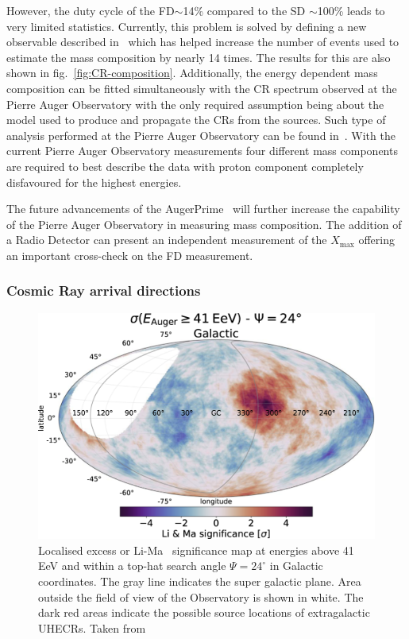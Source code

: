 However, the duty cycle of the \gls{FD}$\sim$14\% compared to the \gls{SD} $\sim$100\% leads to very limited statistics. Currently, this problem is solved by defining a new observable described in~\cite{2017arXiv171007249T} which has helped increase the number of events used to estimate the mass composition by nearly 14 times. The results for this are also shown in fig.~\ref{fig:CR-composition}. Additionally, the energy dependent mass composition can be fitted simultaneously with the \gls{CR} spectrum observed at the Pierre Auger Observatory with the only required assumption being about the model used to produce and propagate the \glspl{CR} from the sources. Such type of analysis performed at the Pierre Auger Observatory can be found in~\cite{2018_auger_comp_spec}. With the current Pierre Auger Observatory measurements four different mass components are required to best describe the data with proton component completely disfavoured for the highest energies.

The future advancements of the AugerPrime~\cite{ANASTASI2022167497} will further increase the capability of the Pierre Auger Observatory in measuring mass composition. The addition of a Radio Detector can present an independent measurement of the $X_{\text{max}}$ offering an important cross-check on the \gls{FD} measurement. 

\subsubsection*{Cosmic Ray arrival directions}
\label{subsubsec:CRdirec}
\begin{figure}[t!]
  \centering
  \includegraphics[width=14.5cm]{thesis_figures/CRnNu/apjac7d4ef1_hr.jpg}
  \caption{Localised excess or Li-Ma~\cite{Li:1983fv} significance map at energies above 41 EeV and within a top-hat search angle $\Psi = 24^\circ$ in Galactic coordinates. The gray line indicates the super galactic plane. Area outside the field of view of the Observatory is shown in white. The dark red areas indicate the possible source locations of extragalactic \glspl{UHECR}. Taken from~\cite{Abreu_2022}}
  \label{fig:CR-anisotropy}
\end{figure}

